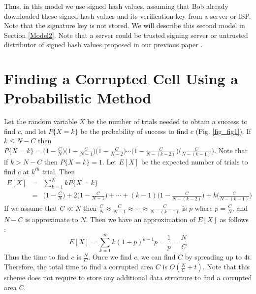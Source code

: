 \documentclass{llncs}
\begin{document}
Thus, in this model we use signed hash values, assuming that Bob already downloaded these signed hash values 
and its verification key from a server or ISP. Note that the signature key is not stored.
We will describe this second model in Section \ref{Model2}. 
Note that a server could be trusted signing server 
or untrusted distributor of signed hash values proposed in our previous paper \cite{AtChKu08}.

\section{Finding a Corrupted Cell Using a Probabilistic Method}
\label{Model1}

\begin{figure*}
\centerline{
\hfil
{}}
\caption{Probabilistic Method}
\label{fig_fig1}
\end{figure*}

Let the random variable $X$ be the number of trials needed to obtain a success to find $c$,
and let $P\{X=k\}$ be the probability of success to find $c$ (Fig. \ref{fig_fig1}).
If $k \leq N-C$ then 
$P\{X=k\} = \bigl(1 - \frac{C}{N}\bigr)\bigl(1 - \frac{C}{N-1}\bigr)\bigl(1 - \frac{C}{N-2}\bigr) \cdots \bigl(1 - \frac{C}{N-(k-2)}\bigr) \bigl(\frac{C}{N-(k-1)}\bigr)$. 
Note that if $k > N-C$ then $P \{X=k\}= 1$.
Let $E[X]$ be the expected number of trials to find $c$ at $k^{th}$ trial. Then 
\begin{eqnarray*}
E[X] &=& \sum_{k=1}^{N} kP\{X=k\} 		\\
	  &=& \biggl(1 - \frac{C}{N}\biggr) + 2\biggl(1 - \frac{C}{N-1}\biggr) + \cdots + (k-1)\biggl( {1 - \frac{C}{N-(k-2)}} \biggr)  + k\biggl(\frac{C}{N-(k-1)}\biggr)
\end{eqnarray*}
If we assume that $C \ll N$ then $\frac{C}{N} \approx \frac{C}{N-1} \approx \cdots \approx \frac{C}{N-(k-1)}$ 
is $p$ where $p = \frac{C}{N}$, and $N-C$ is approximate to $N$. 
Then we have an approximation of $E[X]$ as follows :
\[E[X] = \sum_{k=1}^{\infty} k(1-p)^{k-1}p = \frac{1}{p} = \frac{N}{C}\]
Thus the time to find $c$ is $\frac{N}{C}$. 
Once we find $c$, we can find $C$ by spreading up to $4t$.
Therefore, the total time to find a corrupted area $C$ is $O(\frac{N}{C} + t)$.
Note that this scheme does not require to store any additional data structure to find a corrupted area $C$.
\end{document}
